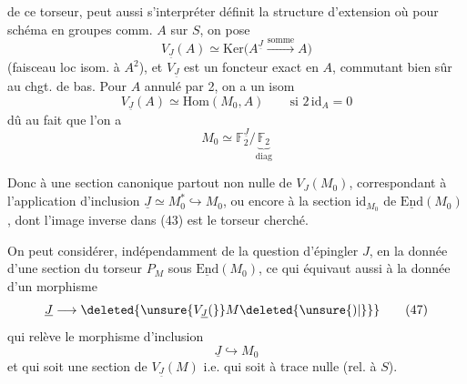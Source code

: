  de ce torseur,   peut aussi s'interpréter   définit la structure d'extension
où pour  schéma  en groupes comm. $A$ sur $S$, on pose
\[
V_{\underline J}(A)\simeq \mathrm{Ker}\big(A^{\underline J}\xrightarrow{\mathrm{somme}} A\big) \tag*{(44)}
\]
(faisceau loc isom. à $A^2$), et $V_{\underline J}$ est un foncteur exact en $A$, commutant bien sûr au chgt. de bas. Pour $A$ annulé par 2, on a un isom
\[
V_{\underline J}(A)\simeq\mathrm{Hom}(M_0,A)\qquad\text{si }2\,\mathrm{id}_A=0 \tag*{(45)}
\]
dû au fait que l'on a
\[
M_0\simeq\mathbb F_2^{\underline J}/\underbrace{\mathbb F_2}_{\mathrm{diag}} \tag*{(46)}
\]

Donc à une section  canonique partout non nulle de $V_J(M_0)$, correspondant à l'application d'inclusion $\underline J\simeq M_0^\ast\hookrightarrow M_0$, ou encore à la section  $\mathrm{id}_{M_0}$ de $\underline{\mathrm{End}}(M_0)$, dont l'image inverse dans (43) est le torseur cherché.


On peut considérer, indépendamment de la question d'épingler $J$,   en  la donnée d'une section du torseur $P_M$ sous $\underline{\mathrm{End}}(M_0)$, ce qui équivaut  aussi à la donnée d'un morphisme
\[
\underline J\longrightarrow\deleted{\unsure{V_{\underline J}(}}M\deleted{\unsure{)|\}}} \tag*{(47)}
\]
qui relève le morphisme d'inclusion
\[
\underline J\hookrightarrow M_0
\]
et qui soit une section de $V_{\underline J}(M)$ i.e. qui soit à trace nulle (rel. à $S$).

